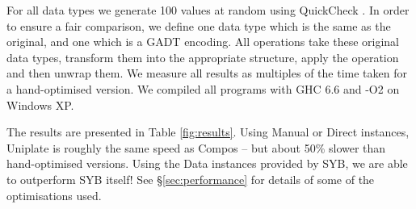 \documentclass[preprint]{sigplanconf}
\begin{document}
For all data types we generate 100 values at random using QuickCheck \citep{quickcheck}. In order to ensure a fair comparison, we define one data type which is the same as the original, and one which is a GADT encoding. All operations take these original data types, transform them into the appropriate structure, apply the operation and then unwrap them. We measure all results as multiples of the time taken for a hand-optimised version. We compiled all programs with GHC 6.6 and -O2 on Windows XP.

The results are presented in Table \ref{fig:results}. Using Manual or Direct instances, Uniplate is roughly the same speed as Compos -- but about 50\% slower than hand-optimised versions. Using the Data instances provided by SYB, we are able to outperform SYB itself! See \S\ref{sec:performance} for details of some of the optimisations used.
\end{document}

